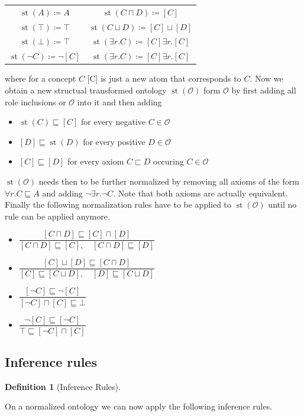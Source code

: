 \documentclass[titlepage]{article}
\newtheorem{definition}{Definition}
\DeclareMathOperator{\st}{st}
\begin{document}
\begin{center}

\begin{tabular}{c c }
$\st(A) \coloneqq  A$ & $\st(C \sqcap D) \coloneqq  [C]$\\
$\st(\top) \coloneqq \top$ & $\st(C \sqcup D) \coloneqq [C] \sqcup [D]$ \\
$\st(\bot) \coloneqq \top$ & $\st(\exists r.C) \coloneqq [C] \exists r.[C]$\\
$\st(\neg C) \coloneqq \neg [C]$ & $\st(\exists r.C) \coloneqq [C] \exists r.[C]$\\
\end{tabular}
\end{center}
where for a concept $C$ [C] is just a new atom that corresponds to $C$.
Now we obtain a new structual transformed ontology $\st(\mathcal{O})$ form $\mathcal{O}$ by
first adding all role inclusions or $\mathcal{O}$ into it and then adding 
\begin{itemize}
  \item $\st(C) \sqsubseteq [C]$ for every negative $ C \in \mathcal{O}$ 
  \item $[D]\sqsubseteq \st(D)$ for every positive $D \in \mathcal{O}$
  \item $[C] \sqsubseteq [D]$ for every axiom $C \sqsubset D$ occuring $C \in \mathcal{O}$
\end{itemize}

$\st(\mathcal{O})$ needs then to be further normalized by removing all axioms of the form $\forall r.C \sqsubseteq A$ and
adding $\neg \exists r. \neg C $. Note that both axioms are actually equivalent.
Finally the following normalization rules have to be applied to $\st(\mathcal{O})$ until no rule can be applied
anymore.

  \begin{itemize}
    \item $ \dfrac{[C \sqcap D] \sqsubseteq [C] \sqcap [D]}{ [C \sqcap D] \sqsubseteq [C], \quad [C \sqcap D] \sqsubseteq [D]}$
    \item $ \dfrac{[C] \sqcup [D] \sqsubseteq [C \sqcap D]}{ [C] \sqsubseteq [C \sqcup D], \quad [D] \sqsubseteq [C \sqcup D]}$
    \item $ \dfrac{[\neg C] \sqsubseteq \neg [C] }{ [\neg C ] \sqcap [C] \sqsubseteq \bot}$
    \item $ \dfrac{\neg [C] \sqsubseteq [\neg C] }{ \top \sqsubseteq [\neg C ] \sqcap [C]}$
  \end{itemize}

\subsection{Inference rules}
\begin{definition}[Inference Rules]
  
\end{definition}
On a normalized ontology we can now apply the following inference rules.
\end{document}
